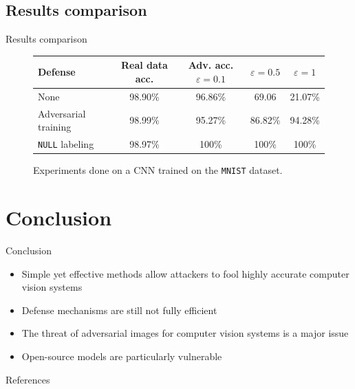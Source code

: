 \documentclass[aspectratio=169]{beamer}
\theoremstyle{definition}
\renewcommand{\epsilon}{\varepsilon}
\begin{document}
\subsection{Results comparison}
\begin{frame}{Results comparison}
  \begin{figure}
    \centering
    \renewcommand{\arraystretch}{1.2}
    \begin{tabular}{|p{3.7cm}||c|c|c|c|}
      \hline
      \centering Defense & Real data acc. & Adv. acc. $\epsilon=0.1$ & $\epsilon=0.5$ & $\epsilon=1$\\
      \hline\hline
      None & 98.90\% & 96.86\% & 69.06 & 21.07\%\\\hline
      Adversarial training & 98.99\% & 95.27\% & 86.82\% & 94.28\%\\\hline
      \texttt{NULL} labeling & 98.97\% & 100\% & 100\% & 100\% \\\hline
    \end{tabular}
  \caption{Experiments done on a CNN trained on the \texttt{MNIST} dataset.}
  \end{figure}
\end{frame}

\section{Conclusion}
\begin{frame}{Conclusion}
  \begin{itemize}
    \item Simple yet effective methods allow attackers to fool highly accurate computer vision systems
    \item Defense mechanisms are still not fully efficient
    \item The threat of adversarial images for computer vision systems is a major issue
    \item Open-source models are particularly vulnerable
  \end{itemize}
\end{frame}


\begin{frame}{References}
    \nocite{*}
    \printbibliography
\end{frame}
\end{document}
